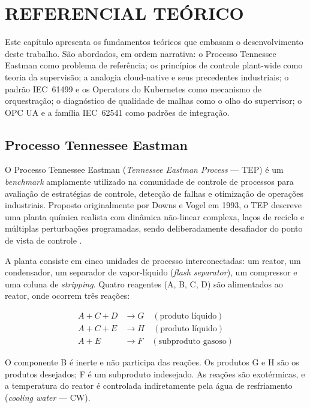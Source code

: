 \chapter[REFERENCIAL TEÓRICO]{REFERENCIAL TEÓRICO}
\label{cha:referencial}

Este capítulo apresenta os fundamentos teóricos que embasam o desenvolvimento deste trabalho. São abordados, em ordem narrativa: o Processo Tennessee Eastman como problema de referência; os princípios de controle plant-wide como teoria da supervisão; a analogia cloud-native e seus precedentes industriais; o padrão IEC~61499 e os Operators do Kubernetes como mecanismo de orquestração; o diagnóstico de qualidade de malhas como o olho do supervisor;  o OPC UA e a família IEC~62541 como padrões de integração.

\section{Processo Tennessee Eastman}
\label{sec:tep}

O Processo Tennessee Eastman (\textit{Tennessee Eastman Process} — TEP) é um \textit{benchmark} amplamente utilizado na comunidade de controle de processos para avaliação de estratégias de controle, detecção de falhas e otimização de operações industriais. Proposto originalmente por Downs e Vogel em 1993, o TEP descreve uma planta química realista com dinâmica não-linear complexa, laços de reciclo e múltiplas perturbações programadas, sendo deliberadamente desafiador do ponto de vista de controle \cite{DOWNS1993}.

A planta consiste em cinco unidades de processo interconectadas: um reator, um condensador, um separador de vapor-líquido (\textit{flash separator}), um compressor e uma coluna de \textit{stripping}. Quatro reagentes (A, B, C, D) são alimentados ao reator, onde ocorrem três reações:

\begin{align}
	A + C + D & \rightarrow G \quad (\text{produto líquido}) \label{eq:rx1}   \\
	A + C + E & \rightarrow H \quad (\text{produto líquido}) \label{eq:rx2}   \\
	A + E     & \rightarrow F \quad (\text{subproduto gasoso}) \label{eq:rx3}
\end{align}

O componente B é inerte e não participa das reações. Os produtos G e H são os produtos desejados; F é um subproduto indesejado. As reações são exotérmicas, e a temperatura do reator é controlada indiretamente pela água de resfriamento (\textit{cooling water} — CW).

